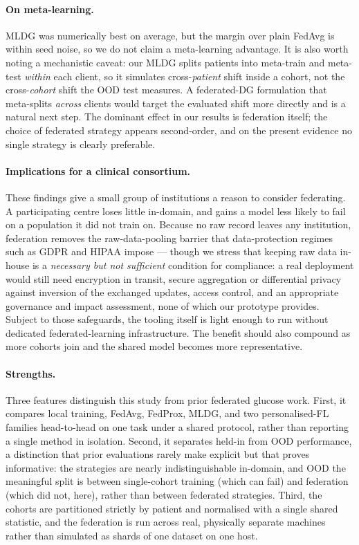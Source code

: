 \documentclass[10pt,letterpaper]{article}
\begin{document}
\paragraph{On meta-learning.} MLDG was numerically best on average, but the
margin over plain FedAvg is within seed noise, so we do not claim a meta-learning
advantage. It is also worth noting a mechanistic caveat: our MLDG splits patients
into meta-train and meta-test \emph{within} each client, so it simulates
cross-\emph{patient} shift inside a cohort, not the cross-\emph{cohort} shift the
OOD test measures. A federated-DG formulation that meta-splits \emph{across}
clients would target the evaluated shift more directly and is a natural next
step. The dominant effect in our results is federation itself; the choice of
federated strategy appears second-order, and on the present evidence no single
strategy is clearly preferable.

\paragraph{Implications for a clinical consortium.} These findings give a small
group of institutions a reason to consider federating. A participating centre
loses little in-domain, and gains a model less likely to fail on a population it
did not train on. Because no raw record leaves any institution, federation
removes the raw-data-pooling barrier that data-protection regimes such as GDPR
and HIPAA impose --- though we stress that keeping raw data in-house is a
\emph{necessary but not sufficient} condition for compliance: a real deployment
would still need encryption in transit, secure aggregation or differential
privacy against inversion of the exchanged updates, access control, and an
appropriate governance and impact assessment, none of which our prototype
provides. Subject to those safeguards, the tooling itself is light enough to run
without dedicated federated-learning infrastructure. The benefit should also
compound as more cohorts join and the shared model becomes more representative.

\paragraph{Strengths.} Three features distinguish this study from prior federated
glucose work. First, it compares local training, FedAvg, FedProx, MLDG, and two
personalised-FL families head-to-head on one task under a shared protocol, rather
than reporting a single method in isolation. Second, it separates held-in from
OOD performance, a distinction that prior evaluations rarely make explicit but
that proves informative: the strategies are nearly indistinguishable in-domain,
and OOD the meaningful split is between single-cohort training (which can fail)
and federation (which did not, here), rather than between federated strategies.
Third, the cohorts are partitioned strictly by patient and normalised with a
single shared statistic, and the federation is run across real, physically
separate machines rather than simulated as shards of one dataset on one host.
\end{document}
